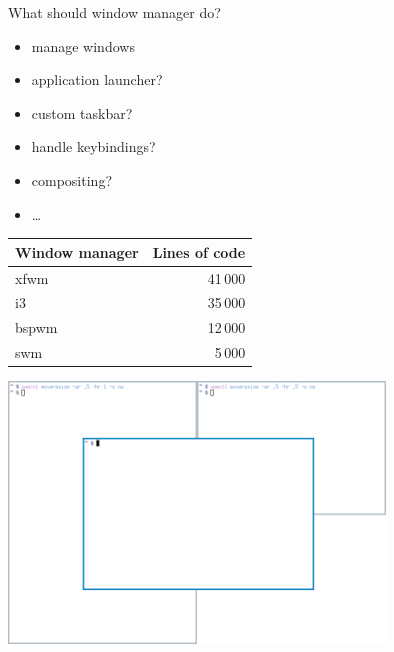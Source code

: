 \documentclass[aspectratio=43]{beamer}
\begin{document}
    \begin{frame}{What should window manager do?}
        \begin{itemize}
            \item manage windows
            \item {\color{gray} application launcher?}
            \item {\color{gray} custom taskbar?}
            \item {\color{gray} handle keybindings?}
            \item {\color{gray} compositing?}
            \item {\color{gray} \ldots}
        \end{itemize}
        \vspace{2em}
        \begin{table}
            \small
            \begin{tabular}{l|r}
                Window manager & Lines of code \\
                \hline
                xfwm & 41\,000 \\
                i3 & 35\,000\\
                bspwm & 12\,000\\
                swm & 5\,000
            \end{tabular}
        \end{table}
    \end{frame}

    \begin{frame}
        \begin{center}
            \includegraphics[width=10cm]{img/wins.png}
        \end{center}
    \end{frame}
\end{document}

